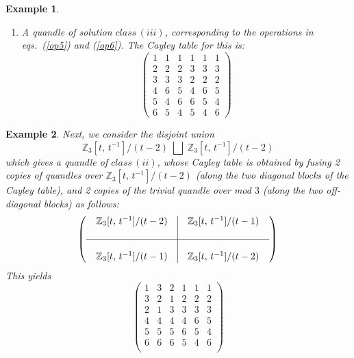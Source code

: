 \documentclass[a4paper,12pt]{article}
\newtheorem{example}{Example}[section]
\begin{document}
\begin{example}
\begin{enumerate}
\item   A quandle of solution $class \, (iii)$, corresponding to the operations in eqs.~(\ref{op5}) and (\ref{op6}). The Cayley table for this is:  
$$  \left(  \begin{array}{cccccc}  
    1 & 1 & 1 & 1 & 1 & 1 \\
    2 & 2 & 2 & 3 & 3 & 3 \\
    3 & 3 & 3 & 2 & 2 & 2 \\
    4 & 6 & 5 & 4 & 6 & 5 \\
    5 & 4 & 6 & 6 & 5 & 4 \\
    6 & 5 & 4 & 5 & 4 & 6
\end{array}  \right)    $$

\end{enumerate}

\end{example}


\begin{example}
Next, we consider the disjoint union  
$$\mathbb{Z}_3 [t, \, t^{-1}] / (t-2) \; \bigsqcup  \; \mathbb{Z}_3 [t, \, t^{-1}]  / (t-2)$$  
which gives a quandle of $class \, (ii)$, whose Cayley table is obtained by fusing 2 copies of quandles over $\mathbb{Z}_3 [t, \, t^{-1}]  / (t-2)$ (along the two diagonal blocks of the Cayley table), and 2 copies of the trivial quandle over mod $3$ (along the two off-diagonal blocks) as follows:  
\[  \left(\begin{array}{c|c}   
\;\;   \mathbb{Z}_3 [t, \, t^{-1}]  / (t-2)  \;\;  & \;\;  \mathbb{Z}_3 [t, \, t^{-1}]  / (t-1) \;\;  \\  &  \\  \hline  \\  
\mathbb{Z}_3 [t, \, t^{-1}]  / (t-1) & \mathbb{Z}_3 [t, \, t^{-1}]  / (t-2)
\end{array}\right)       \]    
This yields   
$$
\left(
\begin{array}{cccccc}
 1 & 3 & 2 & 1 & 1 & 1 \\
 3 & 2 & 1 & 2 & 2 & 2 \\
 2 & 1 & 3 & 3 & 3 & 3 \\
 4 & 4 & 4 & 4 & 6 & 5 \\
 5 & 5 & 5 & 6 & 5 & 4 \\
 6 & 6 & 6 & 5 & 4 & 6 \\
\end{array}
\right)
$$

\end{example}
\end{document}

